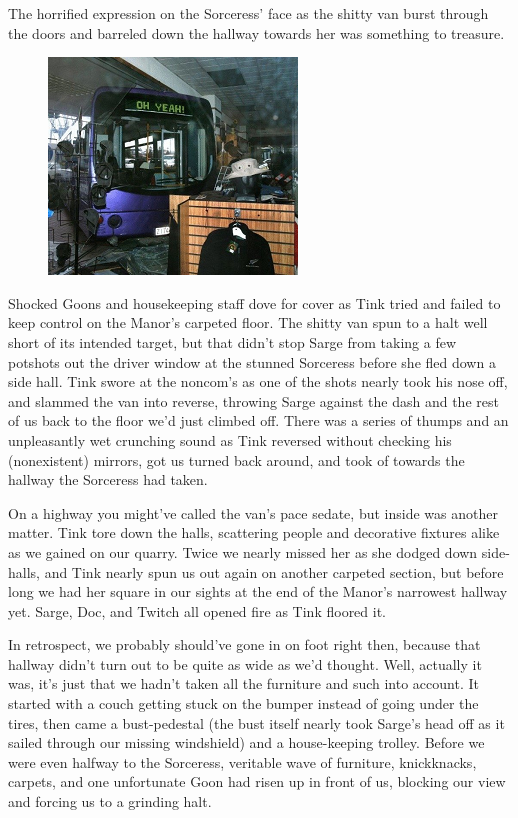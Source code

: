The horrified expression on the Sorceress' face as the shitty van burst through the doors and barreled down the hallway towards her was something to treasure.

\begin{figure}
	\begin{center}
		\includegraphics[width=\figwidth]{pics/18/58.png}
	\end{center}
\end{figure}
Shocked Goons and housekeeping staff dove for cover as Tink tried and failed to keep control on the Manor's carpeted floor. 
The shitty van spun to a halt well short of its intended target, but that didn't stop Sarge from taking a few potshots out the driver window at the stunned Sorceress before she fled down a side hall. 
Tink swore at the noncom's as one of the shots nearly took his nose off, and slammed the van into reverse, throwing Sarge against the dash and the rest of us back to the floor we'd just climbed off. 
 There was a series of thumps and an unpleasantly wet crunching sound as Tink reversed without checking his (nonexistent) mirrors, got us turned back around, and took of towards the hallway the Sorceress had taken.

On a highway you might've called the van's pace sedate, but inside was another matter. 
Tink tore down the halls, scattering people and decorative fixtures alike as we gained on our quarry. 
Twice we nearly missed her as she dodged down side-halls, and Tink nearly spun us out again on another carpeted section, but before long we had her square in our sights at the end of the Manor's narrowest hallway yet. 
Sarge, Doc, and Twitch all opened fire as Tink floored it.

In retrospect, we probably should've gone in on foot right then, because that hallway didn't turn out to be quite as wide as we'd thought. 
Well, actually it was, it's just that we hadn't taken all the furniture and such into account. 
It started with a couch getting stuck on the bumper instead of going under the tires, then came a bust-pedestal (the bust itself nearly took Sarge's head off as it sailed through our missing windshield) and a house-keeping trolley. 
Before we were even halfway to the Sorceress, veritable wave of furniture, knickknacks, carpets, and one unfortunate Goon had risen up in front of us, blocking our view and forcing us to a grinding halt.

